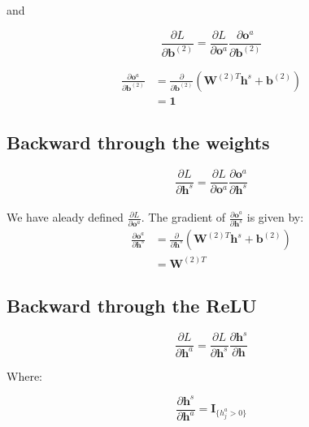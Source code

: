 \documentclass[reqno]{amsart}
\theoremstyle{definition}
\theoremstyle{remark}
\numberwithin{equation}{section}
\begin{document}
and

\begin{equation}
    \frac{\partial L}{\partial \mathbf{b}^{(2)}} = \frac{\partial L}{\partial \mathbf{o}^a}\frac{\partial \mathbf{o}^a}{\partial \mathbf{b}^{(2)}}
\end{equation}

\begin{align}
    \frac{\partial \mathbf{o}^a}{\partial \mathbf{b}^{(2)}} &= \frac{\partial}{\partial \mathbf{b}^{(2)}} (\mathbf{W}^{(2)T} \mathbf{h}^s + \mathbf{b}^{(2)}) \\
    &= \mathbf{1}
\end{align}


\subsection{Backward through the weights}

\begin{equation}
    \frac{\partial L}{\partial \mathbf{h}^s} = \frac{\partial L}{\partial \mathbf{o}^a} \frac{\partial \mathbf{o}^a}{\partial \mathbf{h}^s}
\end{equation}\\

We have aleady defined $\frac{\partial L}{\partial \mathbf{o}^a}$. The gradient of $\frac{\partial \mathbf{o}^a}{\partial \mathbf{h}^s}$ is given by:\\

\begin{align}
    \frac{\partial \mathbf{o}^a}{\partial \mathbf{h}^s} &= \frac{\partial}{\partial \mathbf{h}^s} (\mathbf{W}^{(2)T}\mathbf{h}^s +\mathbf{b}^{(2)})\\
    &= \mathbf{W}^{(2)T}
\end{align}

\subsection{Backward through the ReLU}

\begin{equation}
    \frac{\partial L}{\partial \mathbf{h}^a} = \frac{\partial L}{\partial \mathbf{h}^s} \frac{\partial \mathbf{h}^s}{\partial \mathbf{h}}
\end{equation}

Where:

\begin{equation}
    \frac{\partial \mathbf{h}^s}{\partial \mathbf{h}^a} = \mathbf{I}_{\{h_j^a > 0\}}
\end{equation}
\end{document}
